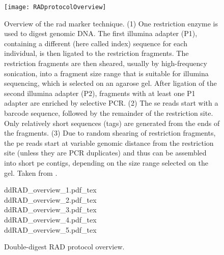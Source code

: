 \documentclass[a4paper,12pt,times,authoryear,twoside,print,index]{Classes/PhDThesisPSnPDF}\usepackage[]{graphicx}\usepackage[]{color}
\begin{document}
\begin{figure}
\centering
\texttt{[image: RADprotocolOverview]}
\caption[Overview of the RAD marker technique.]{Overview of the \gls{rad} marker technique. (1) One restriction enzyme is used to digest genomic DNA. The first illumina adapter (P1), containing a different  (here called \gls{index}) sequence for each individual, is then ligated to the restriction fragments. The restriction fragments are then sheared, usually by high-frequency sonication, into a fragment size range that is suitable for illumina sequencing, which is selected on an agarose gel. After ligation of the second illumina adapter (P2), fragments with at least one P1 adapter are enriched by selective PCR. (2) The \gls{se} reads start with a barcode sequence, followed by the remainder of the restriction site. Only relatively short sequences (tags) are generated from the ends of the fragments. (3) Due to random shearing of restriction fragments, the \gls{pe} reads start at variable genomic distance from the restriction site (unless they are PCR duplicates) and thus can be assembled into short \gls{pe} contigs, depending on the size range selected on the gel. Taken from \cite{Atwood2011}. }
\label{RAD_protocol_overview}
\end{figure}
%
\begin{figure}
\def\svgwidth{.9\textwidth}
{ddRAD_overview_1.pdf_tex}\\ 
\def\svgwidth{\textwidth}
{ddRAD_overview_2.pdf_tex}\\
\def\svgwidth{.9\textwidth}
{ddRAD_overview_3.pdf_tex}\\
\def\svgwidth{.9\textwidth}
{ddRAD_overview_4.pdf_tex}\\
\def\svgwidth{.9\textwidth}
{ddRAD_overview_5.pdf_tex}
\caption[Double-digest RAD protocol overview.]{Double-digest RAD protocol overview.}
\label{ddRAD_protocol_overview}
\end{figure}
\end{document}
